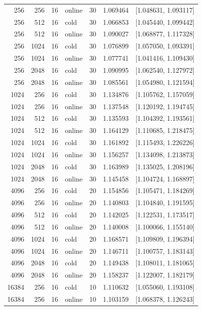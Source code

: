 \begin{longtable}{rrrlrrr}
256 & 256 & 16 & online & 30 & 1.069464 & [1.048631, 1.093117] \\
256 & 512 & 16 & cold & 30 & 1.066853 & [1.045440, 1.099442] \\
256 & 512 & 16 & online & 30 & 1.090027 & [1.068877, 1.117328] \\
256 & 1024 & 16 & cold & 30 & 1.076899 & [1.057050, 1.093391] \\
256 & 1024 & 16 & online & 30 & 1.077741 & [1.041416, 1.109430] \\
256 & 2048 & 16 & cold & 30 & 1.090995 & [1.062540, 1.127972] \\
256 & 2048 & 16 & online & 30 & 1.085561 & [1.054980, 1.121594] \\
1024 & 256 & 16 & cold & 30 & 1.134876 & [1.105762, 1.157059] \\
1024 & 256 & 16 & online & 30 & 1.137548 & [1.120192, 1.194745] \\
1024 & 512 & 16 & cold & 30 & 1.135593 & [1.104392, 1.193561] \\
1024 & 512 & 16 & online & 30 & 1.164129 & [1.110685, 1.218475] \\
1024 & 1024 & 16 & cold & 30 & 1.161892 & [1.115493, 1.226226] \\
1024 & 1024 & 16 & online & 30 & 1.156257 & [1.134098, 1.213873] \\
1024 & 2048 & 16 & cold & 30 & 1.163989 & [1.135025, 1.208196] \\
1024 & 2048 & 16 & online & 30 & 1.145458 & [1.104724, 1.168897] \\
4096 & 256 & 16 & cold & 20 & 1.154856 & [1.105471, 1.184269] \\
4096 & 256 & 16 & online & 20 & 1.140803 & [1.104840, 1.191595] \\
4096 & 512 & 16 & cold & 20 & 1.142025 & [1.122531, 1.173517] \\
4096 & 512 & 16 & online & 20 & 1.140008 & [1.100066, 1.155140] \\
4096 & 1024 & 16 & cold & 20 & 1.168571 & [1.109809, 1.196394] \\
4096 & 1024 & 16 & online & 20 & 1.146711 & [1.100757, 1.183143] \\
4096 & 2048 & 16 & cold & 20 & 1.149438 & [1.108011, 1.181065] \\
4096 & 2048 & 16 & online & 20 & 1.158237 & [1.122007, 1.182179] \\
16384 & 256 & 16 & cold & 10 & 1.110632 & [1.055060, 1.193108] \\
16384 & 256 & 16 & online & 10 & 1.103159 & [1.068378, 1.126243] \\

\end{longtable}
